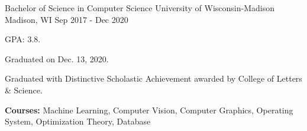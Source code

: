 \begin{cventries}
  \cventry
	{Bachelor of Science in Computer Science} %
	{University of Wisconsin-Madison} %
	{Madison, WI} %
	{Sep 2017 - Dec 2020} %
	{
	  \begin{cvitems} %
		\item {GPA: 3.8.}
		\item {Graduated on Dec. 13, 2020.}
		\item{Graduated with Distinctive Scholastic Achievement awarded by College of Letters \& Science.}
		\item {\textbf{Courses:} Machine Learning, Computer Vision, Computer Graphics, Operating System, Optimization Theory, Database}
	  \end{cvitems}
	}
\end{cventries}
